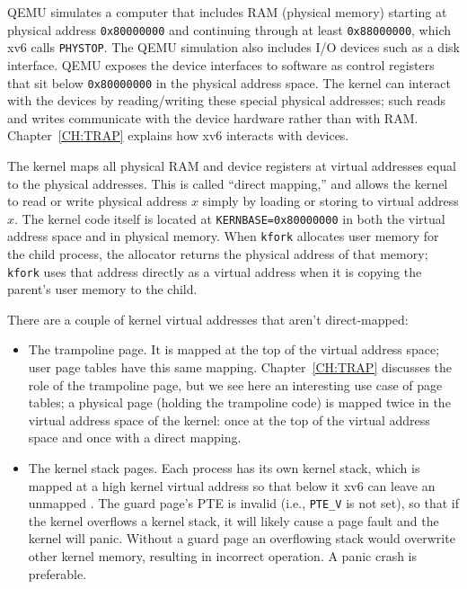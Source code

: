 QEMU simulates a computer that includes RAM (physical memory) starting
at physical address \texttt{0x80000000} and continuing through
at least \texttt{0x88000000}, which xv6 calls \texttt{PHYSTOP}.
The QEMU simulation also
includes I/O devices
such as a disk interface.
QEMU exposes the device interfaces to software as
control registers that sit below
\texttt{0x80000000}
in the physical address space.
The kernel can interact with the devices by reading/writing
these special physical addresses; such reads and writes communicate
with the device hardware rather than with RAM.
Chapter~\ref{CH:TRAP} explains
how xv6 interacts with devices.

The kernel maps all physical RAM and device
registers at virtual addresses equal to the
physical addresses.
This is called ``direct mapping,'' and allows the kernel
to read or write physical address $x$ simply by loading
or storing to virtual address $x$.
The kernel code itself is located at \lstinline{KERNBASE=0x80000000} in both
the virtual address space and in physical memory.
When \lstinline{kfork}
allocates user memory for the child process,
the allocator returns the physical address of that memory;
\lstinline{kfork} uses that address directly as a virtual
address when it is copying the parent's user memory to the child.

There are a couple of kernel virtual
addresses that aren't direct-mapped:

\begin{itemize}
  
\item The trampoline page. It is mapped at the top of the virtual
  address space; user page tables have this same mapping.
  Chapter~\ref{CH:TRAP} discusses the role of the trampoline
  page, but we see here an interesting use case of page tables; a
  physical page (holding the trampoline code) is mapped twice in the
  virtual address space of the kernel: once at the top of the virtual
  address space and once with a direct mapping.

\item The kernel stack pages.  Each process has its own kernel stack,
  which is mapped at a high kernel virtual address
  so that below it xv6 can leave an unmapped .  The guard page's PTE is invalid (i.e.,
  \lstinline{PTE_V} is not set), so that if the kernel overflows
  a kernel stack, it will likely cause a page fault and the kernel will panic.
  Without a guard page an overflowing stack would overwrite other kernel memory,
  resulting in incorrect operation. A panic crash is preferable.

\end{itemize}

